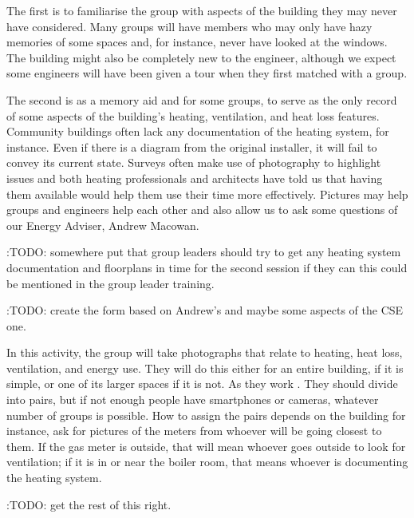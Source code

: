 \documentclass[letterpaper,10pt,english]{jupyterBook}
\begin{document}
\sphinxAtStartPar
The first is to familiarise the group with aspects of the building they may never have considered.  Many groups will have members who may only have hazy memories of some spaces and, for instance, never have looked at the windows.  The building might also be completely new to the engineer, although we expect some engineers will have been given a tour when they first matched with a group.

\sphinxAtStartPar
The second is as a memory aid and for some groups, to serve as the only record of some aspects of the building’s heating, ventilation, and heat loss features.  Community buildings often lack any documentation of the heating system, for instance.  Even if there is a diagram from the original installer, it will fail to convey its current state.  Surveys often make use of photography to highlight issues and both heating professionals and architects have told us that having them available would help them use their time more effectively.  Pictures may help groups and engineers help each other and also allow us to ask some questions of our Energy Adviser, Andrew Macowan.

\sphinxAtStartPar
:TODO: somewhere put that group leaders should try to get any heating system documentation and floorplans in time for the second session if they can \sphinxhyphen{} this could be mentioned in the group leader training.

\sphinxAtStartPar
:TODO: create the form based on Andrew’s and maybe some aspects of the CSE one.

\sphinxAtStartPar
In this activity, the group will take photographs that relate to heating, heat loss, ventilation, and energy use.  They will do this either for an entire building, if it is simple, or one of its larger spaces if it is not.  As they work .  They should divide into pairs, but if not enough people have smartphones or cameras, whatever number of groups is possible. How to assign the pairs depends on the building \sphinxhyphen{} for instance, ask for pictures of the meters from whoever will be going closest to them.  If the gas meter is outside, that will mean whoever goes outside to look for ventilation; if it is in or near the boiler room, that means whoever is documenting the heating system.

\sphinxAtStartPar
:TODO: get the rest of this right.
\end{document}
